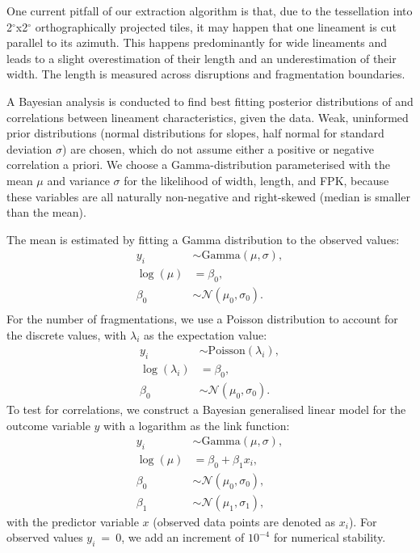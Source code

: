 One current pitfall of our extraction algorithm is that, due to the tessellation into 2$^{\circ}$x2$^{\circ}$ orthographically projected tiles, it may happen that one lineament is cut parallel to its azimuth. This happens predominantly for wide lineaments and leads to a slight overestimation of their length and an underestimation of their width. The length is measured across disruptions and fragmentation boundaries.

A Bayesian analysis is conducted to find best fitting posterior distributions of and correlations between lineament characteristics, given the data. Weak, uninformed prior distributions (normal distributions for slopes, half normal for standard deviation $\sigma$) are chosen, which do not assume either a positive or negative correlation a priori. We choose a Gamma-distribution parameterised with the mean $\mu$ and variance $\sigma$ for the likelihood of width, length, and FPK, because these variables are all naturally non-negative and right-skewed (median is smaller than the mean). 

The mean is estimated by fitting a Gamma distribution to the observed values:
\begin{align}\label{eq_gamma_GLM}
    y_i  &\sim \text{Gamma}(\mu, \sigma),\\
    \log(\mu) &= \beta_0,\\
    \beta_0  &\sim \mathcal{N}(\mu_0,\sigma_0). \\
\end{align}
For the number of fragmentations, we use a Poisson distribution to account for the discrete values, with $\lambda_i$ as the expectation value:
\begin{align}\label{eq_poisson_GLM}
    y_i  &\sim \text{Poisson}(\lambda_i),\\
    \log(\lambda_i) &= \beta_0, \\ %
    \beta_0  &\sim \mathcal{N}(\mu_0,\sigma_0).
\end{align}
To test for correlations, we construct a Bayesian generalised linear model for the outcome variable $y$ with a logarithm as the link function:
\begin{align}
    y_i  &\sim \text{Gamma}(\mu, \sigma),\\
    \log(\mu) &= \beta_0 + \beta_1 x_i,\\
    \beta_0  &\sim \mathcal{N}(\mu_0,\sigma_0), \\
    \beta_1 &\sim \mathcal{N}(\mu_1,\sigma_1),
\end{align}
with the predictor variable $x$ (observed data points are denoted as $x_i$). For observed values $y_i~=~0$, we add an increment of $10^{-4}$ for numerical stability. 

